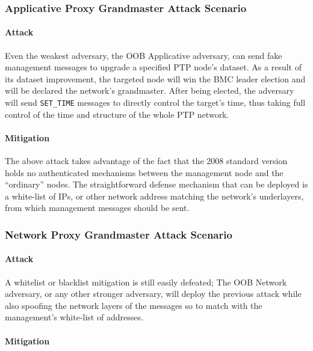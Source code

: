\documentclass[11pt]{article}
\begin{document}
\subsubsection{Applicative Proxy Grandmaster Attack Scenario}\label{manag:scenrio1}

\paragraph{Attack}

Even the weakest adversary, the OOB Applicative adversary, can send fake management messages to upgrade a specified PTP node's dataset. As a result of its dataset improvement, the targeted node will win the BMC leader election and will be declared the network's grandmaster. After being elected, the adversary will send \texttt{SET_TIME} messages to directly control the target's time, thus taking full control of the time and structure of the whole PTP network.



\paragraph{Mitigation}\label{manag:socioeconomic}

The above attack takes advantage of the fact that the 2008 standard version holds no authenticated mechanisms between the management node and the ``ordinary'' nodes. The straightforward defense mechanism that can be deployed is a white-list of IPs, or other network address matching the network's underlayers, from which management messages should be sent.



\subsubsection{Network Proxy Grandmaster Attack Scenario}\label{manag:scenrio2}

\paragraph{Attack}

A whitelist or blacklist mitigation is still easily defeated; The OOB Network adversary, or any other stronger adversary, will deploy the previous attack while also spoofing the network layers of the messages so to match with the management's white-list of addresses.



\paragraph{Mitigation}\label{manag:scenrio2mit}
\end{document}
